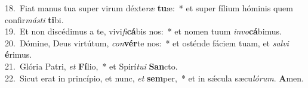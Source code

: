 {18.~}Fiat manus tua super virum déxte\textit{ræ} \textbf{tu}æ:~* et super fílium hóminis quem confir\textit{má}\textit{sti} \textbf{ti}bi.\\
{19.~}Et non discédimus a te, vivi\textit{fi}\textbf{cá}bis nos:~* et nomen tuum \textit{in}\textit{vo}\textbf{cá}bimus.\\
{20.~}Dómine, Deus virtútum, \textit{con}\textbf{vér}te nos:~* et osténde fáciem tuam, et \textit{sal}\textit{vi} \textbf{é}rimus.\\
{21.~}Glória Patri, \textit{et} \textbf{Fí}lio,~* et Spirí\textit{tu}\textit{i} \textbf{San}cto.\\
{22.~}Sicut erat in princípio, et nunc, \textit{et} \textbf{sem}per,~* et in sǽcula sæcu\textit{ló}\textit{rum}. \textbf{A}men.\\
